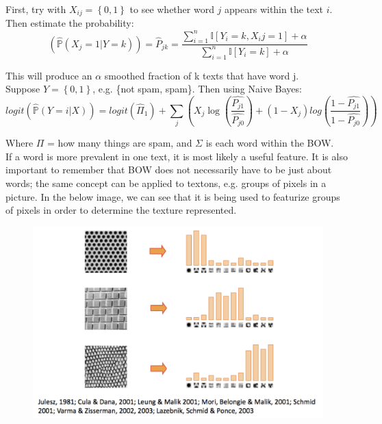 \documentclass[11pt]{report}
\begin{document}
First, try with $X_{ij} = \left\{0 , 1\right\}$ to see whether word $j$ appears within the text $i$. Then estimate the probability: \\

\[ \left({\hat{\mathbb{P}}(X_j=1|Y=k)}\right) = {\hat{P}_{jk}} =  \frac{\sum\limits_{i=1}^n \mathbb{I}[Y_i = k, X_ij = 1] + \alpha}{\sum\limits_{i=1}^n \mathbb{I}[Y_i = k] + \alpha}
\]
 
 This will produce an $\alpha$ smoothed fraction of k texts that have word j. \\
 
 Suppose $Y=\left\{0 , 1\right\}$, e.g. \{not spam, spam\}. Then using Naive Bayes: \\
 
 \[
 logit\left(\hat{\mathbb{P}}(Y=i|X)\right) = logit \left(\hat{\Pi}_1\right) + \sum\limits_{j}\left(X_j\log\left(\frac{\hat{P_{j1}}}{\hat{P_{j0}}}\right) + (1-X_j)log\left(\frac{1-\hat{P_{j1}}}{1-\hat{P_{j0}}}\right)\right)
 \]

Where $\Pi$ = how many things are spam, and $\Sigma$ is each word within the BOW. \\

If a word is more prevalent in one text, it is most likely a useful feature. It is also important to remember that BOW does not necessarily have to be just about words; the same concept can be applied to textons, e.g. groups of pixels in a picture. In the below image, we can see that it is being used to featurize groups of pixels in order to determine the texture represented.\\

\begin{figure}[ht]
    \centering
    \includegraphics[width=1.0\linewidth]{image_3.png}
    \captionsetup{labelformat=empty}
\end{figure}
\end{document}

